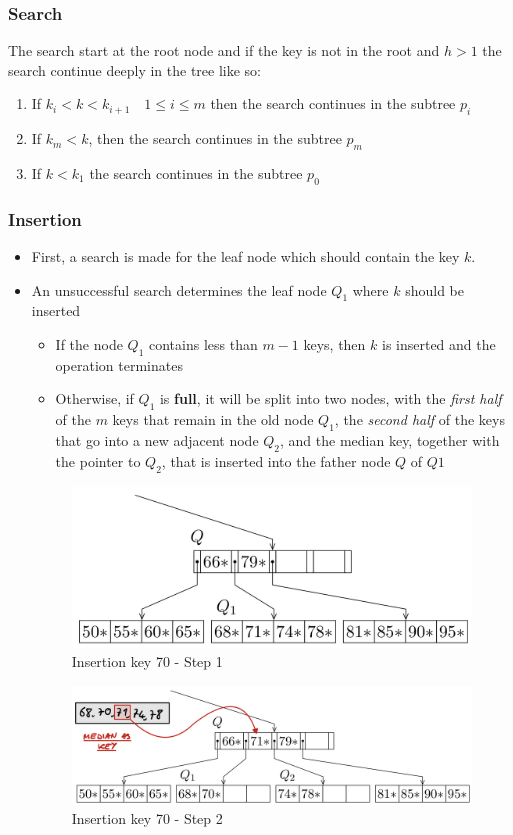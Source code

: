 \subsubsection{Search}
The search start at the root node and if the key is not in the root and \(h > 1\) the search continue deeply in the tree like so:
\begin{enumerate}
    \item If \(k_i < k < k_{i+1} \quad 1 \leq i \leq m\) then the search continues in the subtree \(p_i\)
    \item If \(k_m < k\), then the search continues in the subtree \(p_m\)
    \item If \(k < k_1\) the search continues in the subtree \(p_0\)
\end{enumerate}

\subsubsection{Insertion}
\begin{itemize}
    \item First, a search is made for the leaf node which should contain the key \(k\).
    \item An unsuccessful search determines the leaf node \(Q_1\) where \(k\) should be inserted
    \begin{itemize}
        \item If the node \(Q_1\) contains less than \(m - 1\) keys, then \(k\) is inserted and the operation terminates
        \item  Otherwise, if \(Q_1\) is \textbf{full}, it will be split into two nodes, with the \textit{first half} of the \(m\) keys that remain in the old node \(Q_1\), the \textit{second half} of the keys that go into a new adjacent node \(Q_2\), and the median key, together with the pointer to \(Q_2\), that is inserted into the father node \(Q\) of \(Q1\)
    \end{itemize}
\begin{figure}[!h]
    \centering
    \includegraphics[width=0.5\linewidth]{images/DBMS_Internals/DynamicTreeStructureOrganizations/btree_insertion1.jpeg}
    \caption{Insertion key 70 - Step 1}
\end{figure}

\begin{figure}[!h]
    \centering
    \includegraphics[width=0.5\linewidth]{images/DBMS_Internals/DynamicTreeStructureOrganizations/btree_insertion2.jpeg}
    \caption{Insertion key 70 - Step 2}
\end{figure}

    
\end{itemize}


